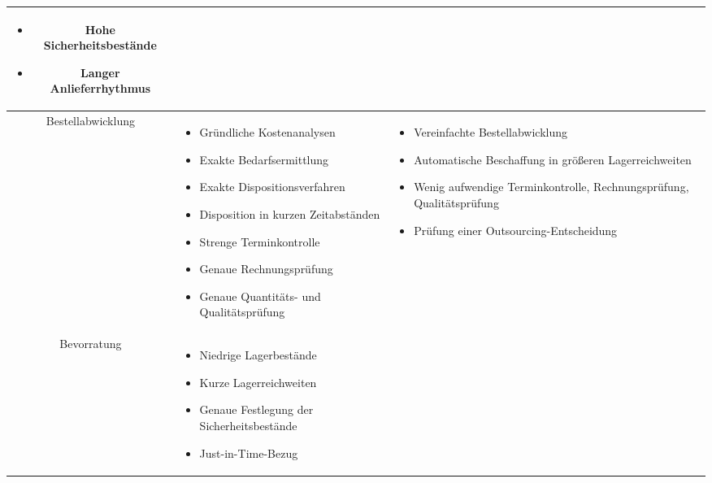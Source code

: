 \documentclass{article}
\begin{document}
\begin{enumerate}[label=(\alph*)]
\begin{center}
\begin{longtable}{c|C{5cm}|C{5cm}}
\begin{itemize}[nosep, before=\vspace{-\baselineskip}, after=\vspace{-\baselineskip}, leftmargin=0.3cm]
					\item Hohe Sicherheitsbestände
					\item Langer Anlieferrhythmus
				\end{itemize} \\
				\hline
				Bestellabwicklung & 
				\begin{itemize}[nosep, before=\vspace{-\baselineskip}, after=\vspace{-\baselineskip}, leftmargin=0.3cm]
					\item Gründliche Kostenanalysen
					\item Exakte Bedarfsermittlung
					\item Exakte Dispositionsverfahren
					\item Disposition in kurzen Zeitabständen
					\item Strenge Terminkontrolle
					\item Genaue Rechnungsprüfung
					\item Genaue Quantitäts- und Qualitätsprüfung
				\end{itemize} & 
				\begin{itemize}[nosep, before=\vspace{-\baselineskip}, after=\vspace{-\baselineskip}, leftmargin=0.3cm]
					\item Vereinfachte Bestellabwicklung
					\item Automatische Beschaffung in größeren Lagerreichweiten
					\item Wenig aufwendige Terminkontrolle, Rechnungsprüfung, Qualitätsprüfung
					\item Prüfung einer Outsourcing-Entscheidung
				\end{itemize} \\
				\hline
				Bevorratung & 
				\begin{itemize}[nosep, before=\vspace{-\baselineskip}, after=\vspace{-\baselineskip}, leftmargin=0.3cm]
					\item Niedrige Lagerbestände
					\item Kurze Lagerreichweiten
					\item Genaue Festlegung der Sicherheitsbestände
					\item Just-in-Time-Bezug
				\end{itemize} & 
				\begin{itemize}[nosep, before=\vspace{-\baselineskip}, after=\vspace{-\baselineskip}, leftmargin=0.3cm]

\end{itemize}
\end{longtable}
\end{center}
\end{enumerate}
\end{document}
